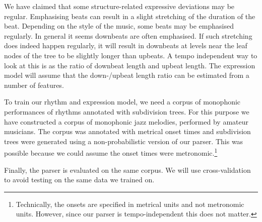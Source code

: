 We have claimed that some structure-related expressive deviations may be regular. Emphasising beats can result in a slight stretching of the duration of the beat. Depending on the style of the music, some beats may be emphasised regularly. In general it seems downbeats are often emphasised. If such stretching does indeed happen regularly, it will result in downbeats at levels near the leaf nodes of the tree to be slightly longer than upbeats. A tempo independent way to look at this is as the ratio of downbeat length and upbeat length. The expression model will assume that the down-/upbeat length ratio can be estimated from a number of features.

To train our rhythm and expression model, we need a corpus of monophonic performances of rhythms annotated with subdivision trees. For this purpose we have constructed a corpus of monophonic jazz melodies, performed by amateur musicians. The corpus was annotated with metrical onset times and subdivision trees were generated using a non-probabilistic version of our parser. This was possible because we could assume the onset times were metronomic.\footnote{Technically, the onsets are specified in metrical units and not metronomic units. However, since our parser is tempo-independent this does not matter.}

Finally, the parser is evaluated on the same corpus. We will use cross-validation to avoid testing on the same data we trained on.
